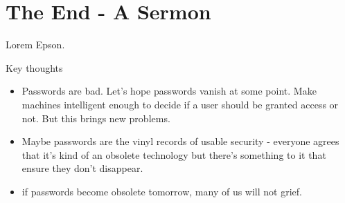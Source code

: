 
\chapter[The End - A Sermon]{The End - A Sermon}\label{chap:the_end}


Lorem Epson. 


Key thoughts

\begin{itemize}
\item Passwords are bad. Let's hope passwords vanish at some point. Make machines intelligent enough to decide if a user should be granted access or not. But this brings new problems.
\item Maybe passwords are the vinyl records of usable security - everyone agrees that it's kind of an obsolete technology but there's something to it that ensure they don't disappear. %
 \item  if passwords become obsolete tomorrow, many of us will not grief. 
\end{itemize}



